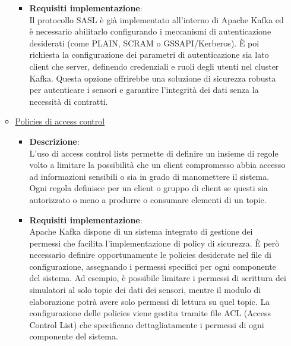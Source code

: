\documentclass[10pt]{article}
\begin{document}
\begin{itemize}
\begin{itemize}
\begin{itemize}
                    \item \textbf{Requisiti implementazione}:\\
                    Il protocollo SASL è già implementato all'interno di Apache Kafka ed è necessario abilitarlo configurando i meccanismi di autenticazione desiderati (come PLAIN, SCRAM o GSSAPI/Kerberos).
                    È poi richiesta la configurazione dei parametri di autenticazione sia lato client che server, definendo credenziali e ruoli degli utenti nel cluster Kafka.
                    Questa opzione offrirebbe una soluzione di sicurezza robusta per autenticare i sensori e garantire l'integrità dei dati senza la necessità di contratti.

                \end{itemize}

                \item \underline{Policies di access control}
                \begin{itemize}
                    \item \textbf{Descrizione}:\\
                    L'uso di access control lists permette di definire un insieme di regole volto a limitare la possibilità che un client
                    compromesso abbia accesso ad informazioni sensibili o sia in grado di manomettere il sistema.
                    Ogni regola definisce per un client o gruppo di client se questi sia autorizzato o meno a produrre o consumare elementi di un topic.

                    \item \textbf{Requisiti implementazione}:\\
                    Apache Kafka dispone di un sistema integrato di gestione dei permessi che facilita l'implementazione di policy di sicurezza.
                    È però necessario definire opportunamente le policies desiderate nel file di configurazione, assegnando i permessi specifici per ogni componente del sistema.
                    Ad esempio, è possibile limitare i permessi di scrittura dei simulatori al solo topic dei dati dei sensori, mentre il modulo di elaborazione potrà avere solo permessi di lettura su quel topic.
                    La configurazione delle policies viene gestita tramite file ACL (Access Control List) che specificano dettagliatamente i permessi di ogni componente del sistema.


\end{itemize}
\end{itemize}
\end{itemize}
\end{document}
